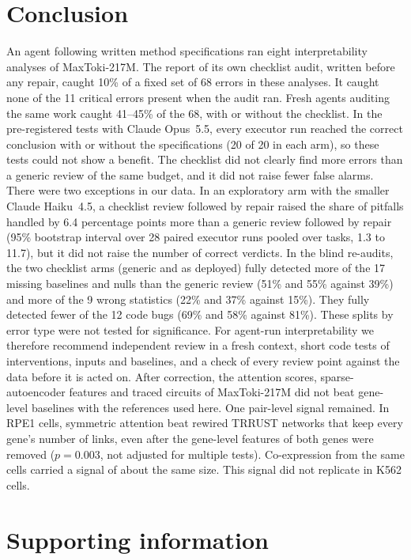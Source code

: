 \section*{Conclusion}
An agent following written method specifications ran eight
interpretability analyses of MaxToki-217M. The report of its own
checklist audit, written before any repair, caught 10\% of a fixed set of
68 errors in these analyses. It caught none of the 11 critical errors
present when the audit ran. Fresh agents auditing the same work caught
41--45\% of the 68, with or without the checklist. In the pre-registered
tests with Claude Opus~5.5, every executor run reached the correct
conclusion with or without the specifications (20 of 20 in each arm), so
these tests could not show a benefit. The checklist did not clearly find
more errors than a generic review of the same budget, and it did not
raise fewer false alarms. There were two exceptions in our data. In an
exploratory arm with the smaller Claude Haiku~4.5, a checklist review
followed by repair raised the share of pitfalls handled by 6.4
percentage points more than a generic review followed by repair (95\%
bootstrap interval over 28 paired executor runs pooled over tasks, 1.3
to 11.7), but it did not raise the number of correct verdicts. In the
blind re-audits, the two checklist arms (generic and as deployed) fully
detected more of the 17 missing baselines and nulls than the generic
review (51\% and 55\% against 39\%) and more of the 9 wrong statistics
(22\% and 37\% against 15\%). They fully detected fewer of the 12 code
bugs (69\% and 58\% against 81\%). These splits by error type were not
tested for significance. For agent-run interpretability we therefore
recommend independent review in a fresh context, short code tests of
interventions, inputs and baselines, and a check of every review point
against the data before it is acted on. After correction, the attention
scores, sparse-autoencoder features and traced circuits of MaxToki-217M
did not beat gene-level baselines with the references used here. One
pair-level signal remained. In RPE1 cells, symmetric attention beat
rewired TRRUST networks that keep every gene's number of links, even
after the gene-level features of both genes were removed ($p = 0.003$,
not adjusted for multiple tests). Co-expression from the same cells
carried a signal of about the same size. This signal did not replicate
in K562 cells.

\section*{Supporting information}


